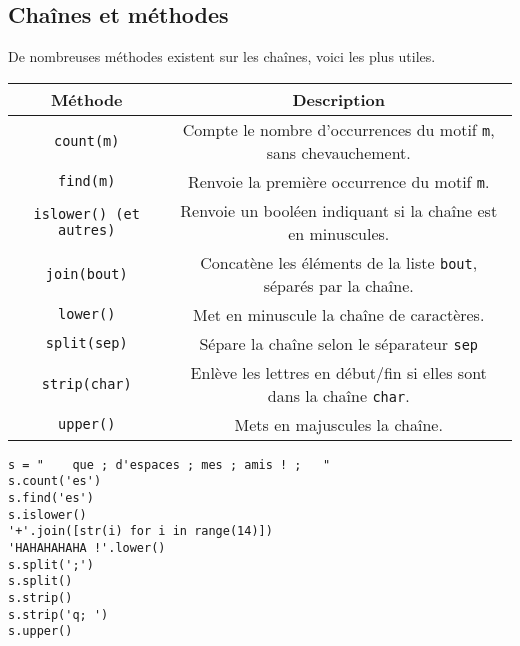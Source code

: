 \subsection{Chaînes et méthodes}
De nombreuses méthodes existent sur les chaînes, voici les plus utiles.
  \begin{center}
    \begin{tabular}{|c|c|}
      \hline
      Méthode & Description \\
      \hline
      \texttt{count(m)}& Compte le nombre d'occurrences du motif \texttt{m}, sans chevauchement.\\
      \hline
      \texttt{find(m)}& Renvoie la première occurrence du motif \texttt{m}.\\
      \hline
      \texttt{islower() (et autres)}& Renvoie un booléen indiquant si la chaîne est en minuscules. \\
      \hline
      \texttt{join(bout)}& Concatène les éléments de la liste \texttt{bout}, séparés par la chaîne.\\
      \hline
      \texttt{lower()}& Met en minuscule la chaîne de caractères.\\
      \hline
      \texttt{split(sep)}& Sépare la chaîne selon le séparateur \texttt{sep}\\
      \hline      
      \texttt{strip(char)}& Enlève les lettres en début/fin si elles sont dans la chaîne \texttt{char}.\\
      \hline
      \texttt{upper()}& Mets en majuscules la chaîne.  \\
      \hline
    \end{tabular}
  \end{center}

\begin{lstlisting}
s = "    que ; d'espaces ; mes ; amis ! ;   "
s.count('es')
s.find('es')
s.islower()
'+'.join([str(i) for i in range(14)])
'HAHAHAHAHA !'.lower()
s.split(';')
s.split()
s.strip()
s.strip('q; ')
s.upper()
\end{lstlisting}
